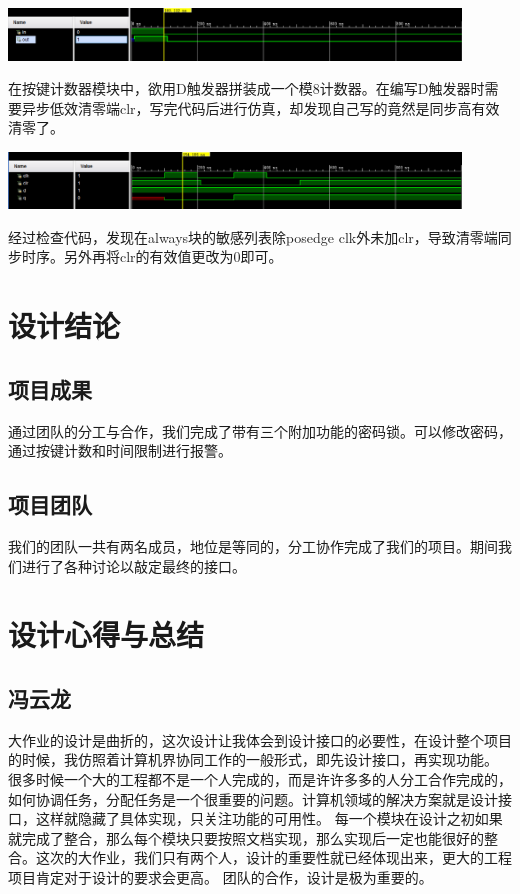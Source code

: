 \documentclass[a4paper,11pt]{ctexart}
\begin{document}
\includegraphics[width=0.9\textwidth]{./images/Lsim2.eps}

在按键计数器模块中，欲用D触发器拼装成一个模8计数器。在编写D触发器时需要异步低效清零端clr，写完代码后进行仿真，却发现自己写的竟然是同步高有效清零了。

\includegraphics[width=0.9\textwidth]{./images/Lsim3.eps}

经过检查代码，发现在always块的敏感列表除posedge clk外未加clr，导致清零端同步时序。另外再将clr的有效值更改为0即可。
\section{设计结论}
\subsection{项目成果}
通过团队的分工与合作，我们完成了带有三个附加功能的密码锁。可以修改密码，通过按键计数和时间限制进行报警。
\subsection{项目团队}
我们的团队一共有两名成员，地位是等同的，分工协作完成了我们的项目。期间我们进行了各种讨论以敲定最终的接口。

\section{设计心得与总结}
\subsection{冯云龙}大作业的设计是曲折的，这次设计让我体会到设计接口的必要性，在设计整个项目的时候，我仿照着计算机界协同工作的一般形式，即先设计接口，再实现功能。
很多时候一个大的工程都不是一个人完成的，而是许许多多的人分工合作完成的，如何协调任务，分配任务是一个很重要的问题。计算机领域的解决方案就是设计接口，这样就隐藏了具体实现，只关注功能的可用性。
每一个模块在设计之初如果就完成了整合，那么每个模块只要按照文档实现，那么实现后一定也能很好的整合。这次的大作业，我们只有两个人，设计的重要性就已经体现出来，更大的工程项目肯定对于设计的要求会更高。
团队的合作，设计是极为重要的。
\end{document}
